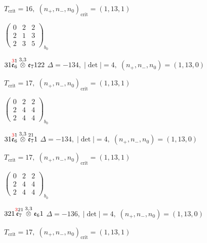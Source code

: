 \documentclass[10pt]{article}
\begin{document}
\hspace{1em}$T_{\text{crit}}=16,\; (n_+,n_-,n_0)_{\text{crit}}=(1,13,1)$

\hspace{2em}$\left(\begin{smallmatrix}0 & 2 & 2 \\ 2 & 1 & 3 \\ 2 & 3 & 5\end{smallmatrix}\right)_{\!b_0}$

\smallskip

$31\overset{\textcolor{red}{3}1}{\mathfrak{e}_6}\overset{3,3}{\otimes}\mathfrak{e}_7122$ \quad $\Delta=-134,\; |\det|=4,\; (n_+,n_-,n_0)=(1,13,0)$

\hspace{1em}$T_{\text{crit}}=17,\; (n_+,n_-,n_0)_{\text{crit}}=(1,13,1)$

\hspace{2em}$\left(\begin{smallmatrix}0 & 2 & 2 \\ 2 & 4 & 4 \\ 2 & 4 & 4\end{smallmatrix}\right)_{\!b_0}$

\smallskip

$31\overset{\textcolor{red}{3}1}{\mathfrak{e}_6}\overset{3,3}{\otimes}\overset{21}{\mathfrak{e}_7}1$ \quad $\Delta=-134,\; |\det|=4,\; (n_+,n_-,n_0)=(1,13,0)$

\hspace{1em}$T_{\text{crit}}=17,\; (n_+,n_-,n_0)_{\text{crit}}=(1,13,1)$

\hspace{2em}$\left(\begin{smallmatrix}0 & 2 & 2 \\ 2 & 4 & 4 \\ 2 & 4 & 4\end{smallmatrix}\right)_{\!b_0}$

\smallskip

$321\overset{\textcolor{red}{3}21}{\mathfrak{e}_7}\overset{3,3}{\otimes}\mathfrak{e}_61$ \quad $\Delta=-136,\; |\det|=4,\; (n_+,n_-,n_0)=(1,13,0)$

\hspace{1em}$T_{\text{crit}}=17,\; (n_+,n_-,n_0)_{\text{crit}}=(1,13,1)$
\end{document}
